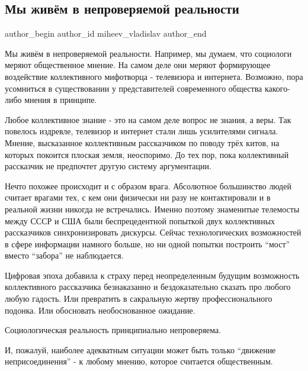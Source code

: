  
 
 
 
 
 
\subsection{Мы живём в непроверяемой реальности}
\label{sec:10_12_2021.fb.miheev_vladislav.1.realnost}
 
\ifcmt
 author_begin
   author_id miheev_vladislav
 author_end
\fi

Мы живём в непроверяемой реальности. Например, мы думаем,  что социологи меряют
общественное мнение. На самом деле они меряют формирующее воздействие
коллективного мифотворца - телевизора и интернета. Возможно, пора усомниться в
существовании у представителей современного общества какого-либо мнения в
принципе. 

Любое коллективное знание - это на самом деле вопрос не знания, а веры. Так
повелось издревле, телевизор и интернет стали лишь усилителями сигнала.
Мнение, высказанное коллективным рассказчиком по поводу трёх китов, на которых
покоится плоская земля, неоспоримо. До тех пор, пока коллективный рассказчик не
предпочтет другую систему аргументации.

Нечто похожее происходит и с образом врага. Абсолютное большинство людей
считает врагами тех, с кем они физически ни разу не контактировали и в реальной
жизни никогда не встречались. Именно поэтому знаменитые телемосты между СССР и
США были беспрецедентной попыткой двух коллективных рассказчиков
синхронизировать дискурсы.  Сейчас  технологических возможностей в сфере
информации намного больше, но ни одной попытки построить \enquote{мост} вместо
\enquote{забора} не наблюдается. 

Цифровая эпоха добавила к страху перед неопределенным будущим возможность
коллективного рассказчика безнаказанно и бездоказательно сказать про любого
любую гадость. Или превратить в сакральную жертву профессионального подонка.
Или обосновать необоснованное ожидание.

Социологическая реальность  принципиально непроверяема.

И, пожалуй, наиболее адекватным ситуации может быть только \enquote{движение
неприсоединения} - к любому мнению, которое считается общественным.

